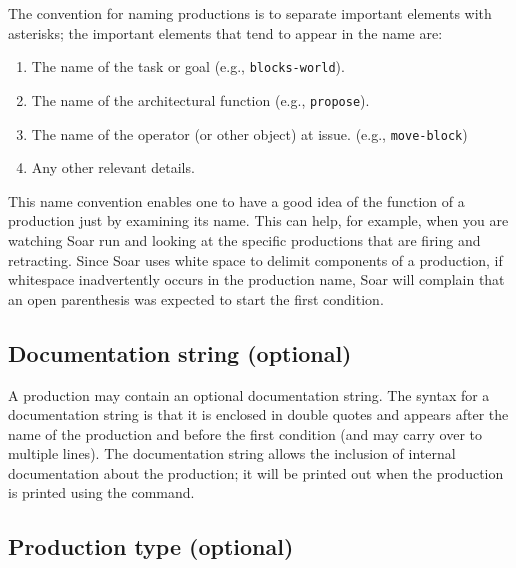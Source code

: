 The convention for naming productions is to separate important elements with asterisks; the important elements that tend to appear in the name are:

\vspace{-12pt}
\begin{enumerate}
\item The name of the task or goal (e.g., \texttt{blocks-world}).
	\vspace{-10pt}
\item The name of the architectural function (e.g., \texttt{propose}).
	\vspace{-10pt}
\item The name of the operator (or other object) at issue. (e.g., \texttt{move-block})
	\vspace{-10pt} 
\item Any other relevant details.
	\vspace{-10pt}
\end{enumerate}

This name convention enables one to have a good idea of the function of a production just by examining its name. This can help, for example, when you are watching Soar run and looking at the specific productions that are firing and retracting.  Since Soar uses white space to delimit components of a production, if whitespace inadvertently occurs in the production name, Soar will complain that an open parenthesis was expected to start the first condition.

\subsection{Documentation string (optional)}

A production may contain an optional documentation string. The syntax for a documentation string is that it is enclosed in double quotes and appears after the name of the production and before the first condition (and may carry over to multiple lines). The documentation string allows the inclusion of internal documentation about the production; it will be printed out when the production is printed using the  command.

\subsection{Production type (optional)}

